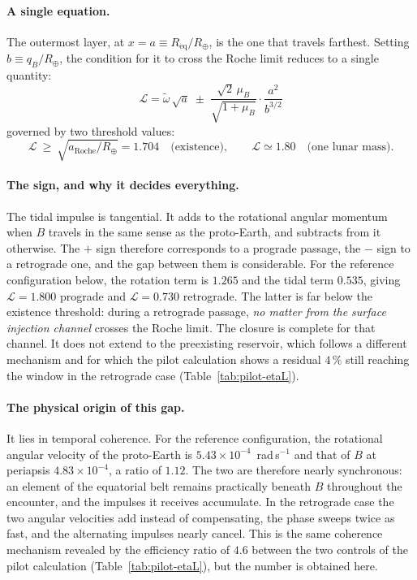 \documentclass[11pt,a4paper,openany]{report}
\newcommand{\Rt}{R_{\oplus}}
\newcommand{\Req}{R_{\mathrm{eq}}}
\newcommand{\aR}{a_{\mathrm{Roche}}}
\begin{document}
\paragraph{A single equation.} The outermost layer, at $x=a\equiv\Req/\Rt$, is the one that travels
farthest. Setting $b\equiv q_B/\Rt$, the condition for it to cross the Roche limit reduces to a
single quantity:
\begin{equation}
\boxed{\;
\mathcal{L}
=\tilde\omega\,\sqrt{a}
\;\pm\;\frac{\sqrt2\,\mu_B}{\sqrt{1+\mu_B}}\cdot\frac{a^{2}}{b^{3/2}}\;}
\label{eq:equation-lune}
\end{equation}
governed by two threshold values:
\begin{equation}
\mathcal{L}\ \ge\ \sqrt{\aR/\Rt}=1.704
\quad\text{(existence)},
\qquad
\mathcal{L}\simeq1.80
\quad\text{(one lunar mass)}.
\label{eq:seuils-lune}
\end{equation}

\paragraph{The sign, and why it decides everything.} The tidal impulse is tangential. It adds to the
rotational angular momentum when $B$ travels in the same sense as the proto-Earth, and subtracts
from it otherwise. The $+$ sign therefore corresponds to a prograde passage, the $-$ sign to a
retrograde one, and the gap between them is considerable. For the reference configuration below, the
rotation term is $1.265$ and the tidal term $0.535$, giving $\mathcal{L}=1.800$ prograde and
$\mathcal{L}=0.730$ retrograde. The latter is far below the existence threshold: during a retrograde passage, \emph{no matter from
the surface injection channel} crosses the Roche limit. The closure is complete for that channel. It
does not extend to the preexisting reservoir, which follows a different mechanism and for which the
pilot calculation shows a residual $4\,\%$ still reaching the window in the retrograde case
(Table~\ref{tab:pilot-etaL}).

\paragraph{The physical origin of this gap.} It lies in temporal coherence. For the reference
configuration, the rotational angular velocity of the proto-Earth is
$5.43\times10^{-4}$~rad\,s$^{-1}$ and that of $B$ at periapsis $4.83\times10^{-4}$, a ratio of
$1.12$. The two are therefore nearly synchronous: an element of the equatorial belt remains
practically beneath $B$ throughout the encounter, and the impulses it receives accumulate. In the
retrograde case the two angular velocities add instead of compensating, the phase sweeps twice as
fast, and the alternating impulses nearly cancel. This is the same coherence mechanism revealed by
the efficiency ratio of $4.6$ between the two controls of the pilot calculation
(Table~\ref{tab:pilot-etaL}), but the number is obtained here.
\end{document}
